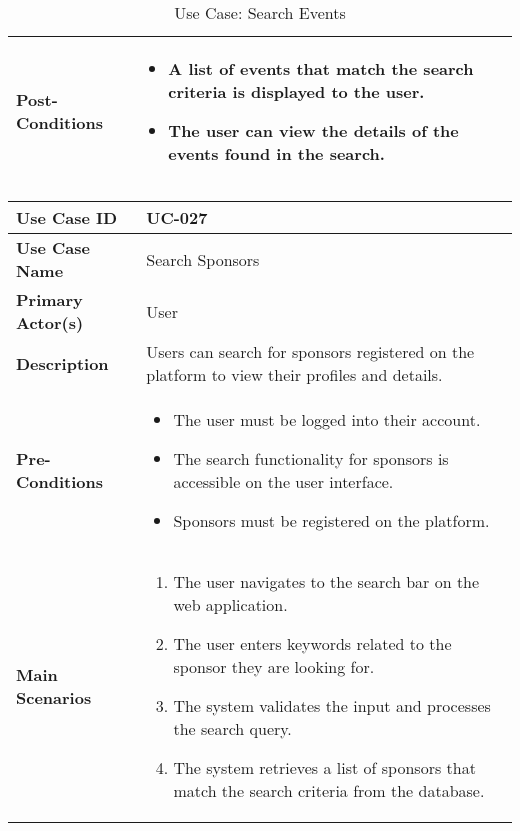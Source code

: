 \begin{table}[!ht]
\begin{tabularx}{\textwidth}{|l|X|}
        \hline
        \textbf{Post-Conditions} & 
        \begin{itemize}[label=--,itemsep=0pt]
            \item A list of events that match the search criteria is displayed to the user.
            \item The user can view the details of the events found in the search.
        \end{itemize} \\
        \hline
    \end{tabularx}
    \caption{Use Case: Search Events}
    \label{tab:use-case-search-events}
\end{table}


\begin{table}[!ht]
    \centering
    \renewcommand{\arraystretch}{1.3} %
    \begin{tabularx}{\textwidth}{|l|X|}
        \hline
        \textbf{Use Case ID} & UC-027 \\
        \hline
        \textbf{Use Case Name} & Search Sponsors \\
        \hline
        \textbf{Primary Actor(s)} & User \\
        \hline
        \textbf{Description} & Users can search for sponsors registered on the platform to view their profiles and details. \\
        \hline
        \textbf{Pre-Conditions} & 
        \begin{itemize}[label=--,itemsep=0pt]
            \item The user must be logged into their account.
            \item The search functionality for sponsors is accessible on the user interface.
            \item Sponsors must be registered on the platform.
        \end{itemize} \\
        \hline
        \textbf{Main Scenarios} & 
        \begin{enumerate}[label=\arabic*.,itemsep=0pt]
            \item The user navigates to the search bar on the web application.
            \item The user enters keywords related to the sponsor they are looking for.
            \item The system validates the input and processes the search query.
            \item The system retrieves a list of sponsors that match the search criteria from the database.

\end{enumerate}
\end{tabularx}
\end{table}
